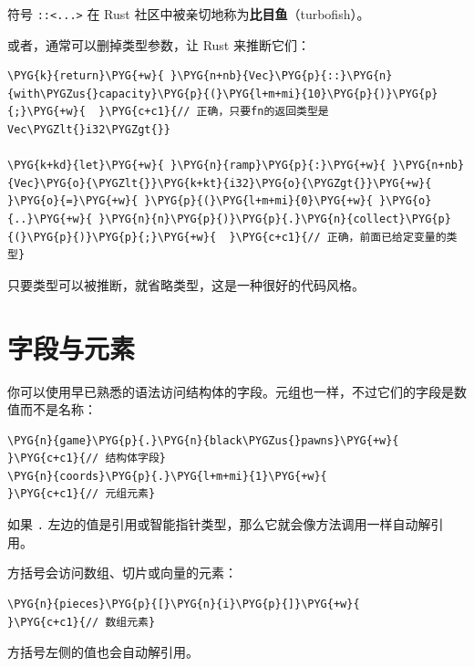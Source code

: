 符号 \texttt{::<...>} 在 Rust 社区中被亲切地称为\textbf{比目鱼}（turbofish）。

或者，通常可以删掉类型参数，让 Rust 来推断它们：

\begin{Verbatim}[commandchars=\\\{\},breaklines=true,breakanywhere=true,fontsize=\codefont,xleftmargin=17bp]
\PYG{k}{return}\PYG{+w}{ }\PYG{n+nb}{Vec}\PYG{p}{::}\PYG{n}{with\PYGZus{}capacity}\PYG{p}{(}\PYG{l+m+mi}{10}\PYG{p}{)}\PYG{p}{;}\PYG{+w}{  }\PYG{c+c1}{// 正确，只要fn的返回类型是Vec\PYGZlt{}i32\PYGZgt{}}

\PYG{k+kd}{let}\PYG{+w}{ }\PYG{n}{ramp}\PYG{p}{:}\PYG{+w}{ }\PYG{n+nb}{Vec}\PYG{o}{\PYGZlt{}}\PYG{k+kt}{i32}\PYG{o}{\PYGZgt{}}\PYG{+w}{ }\PYG{o}{=}\PYG{+w}{ }\PYG{p}{(}\PYG{l+m+mi}{0}\PYG{+w}{ }\PYG{o}{..}\PYG{+w}{ }\PYG{n}{n}\PYG{p}{)}\PYG{p}{.}\PYG{n}{collect}\PYG{p}{(}\PYG{p}{)}\PYG{p}{;}\PYG{+w}{  }\PYG{c+c1}{// 正确，前面已给定变量的类型}
\end{Verbatim}

只要类型可以被推断，就省略类型，这是一种很好的代码风格。

\section{字段与元素}

你可以使用早已熟悉的语法访问结构体的字段。元组也一样，不过它们的字段是数值而不是名称：

\begin{Verbatim}[commandchars=\\\{\},breaklines=true,breakanywhere=true,fontsize=\codefont,xleftmargin=17bp]
\PYG{n}{game}\PYG{p}{.}\PYG{n}{black\PYGZus{}pawns}\PYG{+w}{   }\PYG{c+c1}{// 结构体字段}
\PYG{n}{coords}\PYG{p}{.}\PYG{l+m+mi}{1}\PYG{+w}{           }\PYG{c+c1}{// 元组元素}
\end{Verbatim}

如果 \texttt{.} 左边的值是引用或智能指针类型，那么它就会像方法调用一样自动解引用。

方括号会访问数组、切片或向量的元素：

\begin{Verbatim}[commandchars=\\\{\},breaklines=true,breakanywhere=true,fontsize=\codefont,xleftmargin=17bp]
\PYG{n}{pieces}\PYG{p}{[}\PYG{n}{i}\PYG{p}{]}\PYG{+w}{          }\PYG{c+c1}{// 数组元素}
\end{Verbatim}

方括号左侧的值也会自动解引用。

